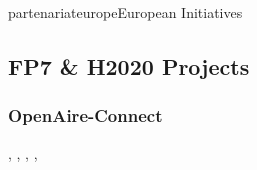 \documentclass{ra2018}
\begin{document}
\begin{module}{partenariat}{europe}{European Initiatives}

\subsection{FP7 \& H2020 Projects}








\subsubsection{OpenAire-Connect}
\begin{participants}    	
	, 	
	,
	,
	,
\end{participants}  


\end{module}
\end{document}
